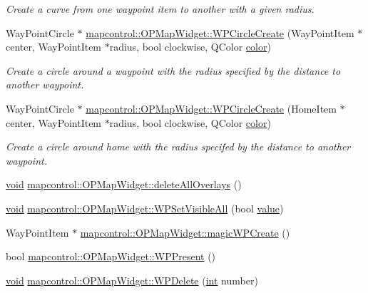 \begin{DoxyCompactItemize}
\begin{DoxyCompactList}\small\item\em Create a curve from one waypoint item to another with a given radius. \end{DoxyCompactList}\item 
Way\-Point\-Circle $\ast$ \hyperlink{group___o_p_map_widget_ga8843daa4f0da4fe9343c9cee78bd6a1d}{mapcontrol\-::\-O\-P\-Map\-Widget\-::\-W\-P\-Circle\-Create} (Way\-Point\-Item $\ast$center, Way\-Point\-Item $\ast$radius, bool clockwise, Q\-Color \hyperlink{glext_8h_a3ea846f998d64f079b86052b6c4193a8}{color})
\begin{DoxyCompactList}\small\item\em Create a circle around a waypoint with the radius specified by the distance to another waypoint. \end{DoxyCompactList}\item 
Way\-Point\-Circle $\ast$ \hyperlink{group___o_p_map_widget_gad8d5513836ce91c3ab5f84cf81ce2ec8}{mapcontrol\-::\-O\-P\-Map\-Widget\-::\-W\-P\-Circle\-Create} (Home\-Item $\ast$center, Way\-Point\-Item $\ast$radius, bool clockwise, Q\-Color \hyperlink{glext_8h_a3ea846f998d64f079b86052b6c4193a8}{color})
\begin{DoxyCompactList}\small\item\em Create a circle around home with the radius specifed by the distance to another waypoint. \end{DoxyCompactList}\item 
\hyperlink{group___u_a_v_objects_plugin_ga444cf2ff3f0ecbe028adce838d373f5c}{void} \hyperlink{group___o_p_map_widget_gaaad12163774b8b524d7d05ed28b01cae}{mapcontrol\-::\-O\-P\-Map\-Widget\-::delete\-All\-Overlays} ()
\item 
\hyperlink{group___u_a_v_objects_plugin_ga444cf2ff3f0ecbe028adce838d373f5c}{void} \hyperlink{group___o_p_map_widget_ga9a1f7cb8eb3ca498061257be74ed76c6}{mapcontrol\-::\-O\-P\-Map\-Widget\-::\-W\-P\-Set\-Visible\-All} (bool \hyperlink{glext_8h_aa0e2e9cea7f208d28acda0480144beb0}{value})
\item 
Way\-Point\-Item $\ast$ \hyperlink{group___o_p_map_widget_gad4bf26f4b1c6f177513e61bd70956360}{mapcontrol\-::\-O\-P\-Map\-Widget\-::magic\-W\-P\-Create} ()
\item 
bool \hyperlink{group___o_p_map_widget_ga22fc188ce6991cc900182e1a60b3ee34}{mapcontrol\-::\-O\-P\-Map\-Widget\-::\-W\-P\-Present} ()
\item 
\hyperlink{group___u_a_v_objects_plugin_ga444cf2ff3f0ecbe028adce838d373f5c}{void} \hyperlink{group___o_p_map_widget_ga7bea26b184175ee4cf10a9103b59de32}{mapcontrol\-::\-O\-P\-Map\-Widget\-::\-W\-P\-Delete} (\hyperlink{ioapi_8h_a787fa3cf048117ba7123753c1e74fcd6}{int} number)

\end{DoxyCompactItemize}
